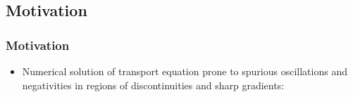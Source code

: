 \documentclass{beamer}
\begin{document}
\subsection{Motivation}
\begin{frame}
\frametitle{Motivation}

\begin{itemize}
   \item Numerical solution of transport equation prone to spurious oscillations
   and negativities in regions of discontinuities and sharp gradients:
\end{itemize}

\end{frame}
%
%
\end{document}

